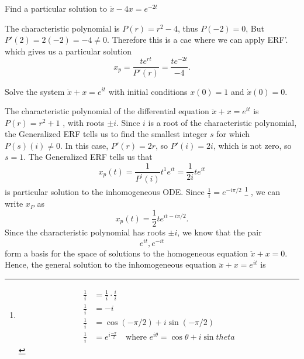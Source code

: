 \begin{example}
  Find a particular solution to $\ddot{x} -4x = e^{-2t}$
\end{example}

\Solution The characteristic polynomial is $P(r) = r^2 - 4$, thus $P(-2) = 0$, But
$P'(2) = 2(-2) = -4 \ne 0$. Therefore this is a cae where we can apply ERF'.
which gives us a particular solution
\begin{equation*}
  x_ p = \frac{te^{rt}}{P'(r)} = \frac{te^{-2t}}{-4}.
\end{equation*}

\begin{example}
  Solve the system $\ddot{x} + x = e^{it}$ with initial conditions $x(0)=1$ and $\dot{x}(0) = 0$.
\end{example}
The characteristic polynomial of the differential equation $\ddot{x} + x = e^{it}$ is $P(r) = r^2 + 1$
, with roots $\pm i$.
Since $i$ is a root of the characteristic polynomial, the {\color{blue}Generalized ERF} tells
us to find the smallest integer $s$ for which $P(s)(i) \ne 0$.
In this case, $P'(r) = 2r$, so $P'(i) = 2i$, which is not zero, so $s = 1$.
The Generalized ERF tells us that
\begin{equation*}
  \displaystyle  x_ p\left(t\right)=\frac{1}{P^{\prime }\left(i\right)}t^{1}e^{it}
  =\frac{1}{2i}te^{it}
\end{equation*}
is particular solution to the inhomogeneous ODE.
Since $\frac{1}{i} = e^{-i \pi/2}$ \footnote{
  \begin{align*}
    \frac{1}{i} &= \frac{1}{i} \cdot \frac{i}{i} \\
    \frac{1}{i} &= -i \\
    \frac{1}{i} &= \cos (-\pi / 2) + i \sin (-\pi / 2) \\
    \frac{1}{i} &= e^{i \frac{-\pi}{2}}
                  \quad \text{where } e^{i \theta} = \cos \theta + i \sin theta     
  \end{align*}
}
, we can write $x _P$ as
\begin{equation*}
  \displaystyle  x_ p\left(t\right)=\frac{1}{2}te^{it-i\pi /2}.
\end{equation*}
Since the characteristic polynomial has roots $\pm i$, we know that the pair
\begin{equation*}
  \displaystyle  e^{it},e^{-it}
\end{equation*}
form a basis for the space of solutions to the homogeneous equation
$\ddot{x}+x=0$.
Hence, the general solution to the inhomogeneous equation
$\ddot{x}+x=e^{it}$ is
